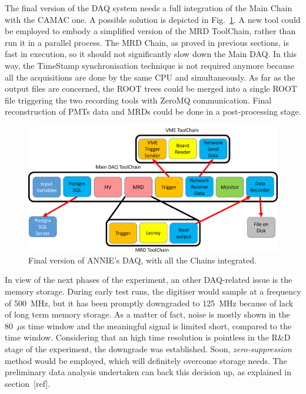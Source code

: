  The final version of the DAQ system needs a full integration of the Main Chain with the %
 CAMAC one.
 A possible solution is depicted in Fig.~\ref{fig:daqcomplete}.
 A new tool could be employed to embody a simplified version of the MRD ToolChain, rather than %
 run it in a parallel process.
 The MRD Chain, as proved in previous sections, is fast in execution, so it should not %
 significantly slow down the Main DAQ.
 In this way, the TimeStamp synchronisation technique is not required anymore because all the %
 acquisitions are done by the same CPU and simultaneously.
 As far as the output files are concerned, the ROOT trees could be merged into a single ROOT file %
 triggering the two recording tools with ZeroMQ communication.
 Final reconstruction of PMTs data and MRDs could be done in a post-processing stage.

\begin{figure}[]
  \centering
  \includegraphics[scale=0.17]{pics/pag5richardshkmeeting}
  \caption{Final version of ANNIE's DAQ, with all the Chains integrated.}
  \label{fig:daqcomplete}
\end{figure}

 In view of the next phases of the experiment, an other DAQ-related issue is the memory storage.
 During early test runs, the digitiser would sample at a frequency of 500~MHz, but it has been %
 promptly downgraded to 125~MHz because of lack of long term memory storage.
 As a matter of fact, noise is mostly shown in the 80~$\mu$s time window and %
 the meaningful signal is limited short, compared to the time window.
 Considering that an high time resolution is pointless in the R\&D stage of the experiment, the %
 downgrade was established.
 Soon, \emph{zero-suppression} method would be employed, which will definitely overcome storage needs.
 The preliminary data analysis undertaken can back this decision up, as explained in section~[ref].
